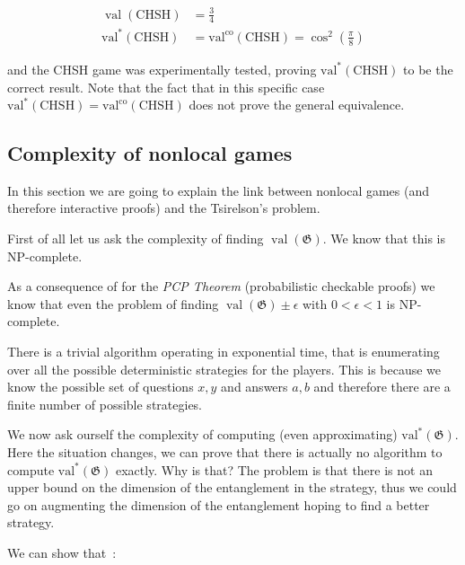  \begin{align}
    \operatorname{val}(\text{CHSH}) &= \frac{3}{4} \\
    \operatorname{val^{*}}(\text{CHSH}) &= \operatorname{val^{co}}(\text{CHSH}) = \cos^2\left(\frac{\pi}{8}\right) 
 \end{align}

 and the CHSH game was experimentally tested, proving $\operatorname{val^{*}}(\text{CHSH})$ to be the correct result.
Note that the fact that in this specific case $\operatorname{val^{*}}(\text{CHSH}) = \operatorname{val^{co}}(\text{CHSH}) $  does not prove the general equivalence.

\subsection{Complexity of nonlocal games}
In this section we are going to explain the link between nonlocal games (and therefore interactive proofs) and the Tsirelson's problem.

First of all let us ask the complexity of finding $\operatorname{val}(\mathfrak{G})$. 
We know that this is NP-complete. 

As a consequence of for the \emph{PCP Theorem} (probabilistic checkable proofs) we know that even the problem of finding $\operatorname{val}(\mathfrak{G}) \pm \epsilon$ with $ 0 < \epsilon < 1$ is NP-complete.

There is a trivial algorithm operating in exponential time, that is enumerating over all the possible deterministic strategies for the players. This is because we know the possible set of questions $x,y$ and answers $a,b$ and therefore there are a finite number of possible strategies.

We now ask ourself the complexity of computing (even approximating) $\operatorname{val^{*}}(\mathfrak{G})$. Here the situation changes, we can prove that there is actually no algorithm to compute $\operatorname{val^{*}}(\mathfrak{G})$ exactly. Why is that? The problem is that there is not an upper bound on the dimension of the entanglement in the strategy, thus we could go on augmenting the dimension of the entanglement hoping to find a better strategy.



We can show that~\cite{mipre}:

